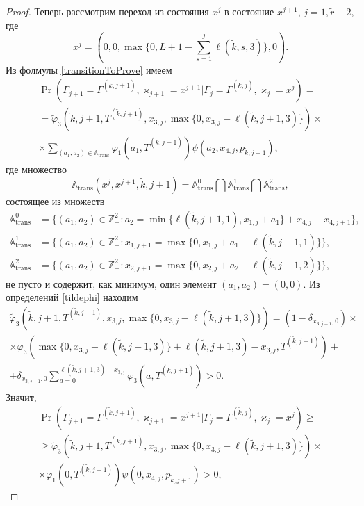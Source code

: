 \documentclass[a4paper,12pt,russian]{extarticle}
\begin{document}
\begin{proof}
Теперь рассмотрим переход из состояния $x^j$ в состояние $x^{j+1}$, $j=\overline{1,\tilde{r}-2}$, где
\begin{equation*}
x^j = (0,0,\max{\{0,L+1-\sum_{s=1}^{j} \ell(\tilde{k},s,3)\}},0).
\end{equation*}
Из фолмулы \eqref{transitionToProve} имеем
\begin{multline*}
\Pr(\Gamma_{j+1}=\Gamma^{(\tilde{k},j+1)}, \varkappa_{j+1}=x^{j+1}|
\Gamma_{j}=\Gamma^{(\tilde{k},j)}, \varkappa_{j}=x^j)=\\
=\widetilde{\varphi}_3(\tilde{k},j+1,T^{(\tilde{k},j+1)},x_{3,j},\max{\{0,x_{3,j} - \ell(\tilde{k},j+1,3)\}})\times \\
\times
\sum_{(a_1,a_2)\in {\mathbb A}_{\mathrm{trans}}}\varphi_1(a_1,T^{(\tilde{k},j+1)})  \psi(a_2,x_{4,j}, p_{\tilde{k},j+1}),
\end{multline*}
где множество 
\begin{equation*}
{\mathbb A}_{\mathrm{trans}}(x^j,x^{j+1},\tilde{k},j+1) = {\mathbb A}_{\mathrm{trans}}^0 \bigcap {\mathbb A}_{\mathrm{trans}}^1\bigcap {\mathbb A}_{\mathrm{trans}}^2,
\end{equation*}
состоящее из множеств 
\begin{align*}
{\mathbb A}_{\mathrm{trans}}^0 &= \{(a_1,a_2) \in \mathbb{Z}_+^2 \colon a_2 = \min{\{\ell(\tilde{k},j+1,1), x_{1,j}+a_1}\} +x_{4,j}- x_{4,j+1}\},\\
{\mathbb A}_{\mathrm{trans}}^1 &= \{(a_1,a_2) \in \mathbb{Z}_+^2 \colon x_{1,j+1}=\max{\{0,x_{1,j}+a_1-\ell(\tilde{k},j+1,1)\}}\},\\
 {\mathbb A}_{\mathrm{trans}}^2 &= \{(a_1,a_2) \in \mathbb{Z}_+^2 \colon  x_{2,j+1} =\max{\{0,x_{2,j}+a_2-\ell(\tilde{k},j+1,2)\}}\},
\end{align*}
не пусто и содержит, как минимум, один элемент $(a_1,a_2)=(0,0)$. Из определений \eqref{tildephi} находим
\begin{multline*}
\widetilde{\varphi}_3(\tilde{k},j+1,T^{(\tilde{k},j+1)},x_{3,j},\max{\{0,x_{3,j} - \ell(\tilde{k},j+1,3)\}})= (1-\delta_{x_{3,j+1},0}) \times \\\times\varphi_3(\max{\{0,x_{3,j} - \ell(\tilde{k},j+1,3)\}} + \ell (\tilde{k},j+1,3) - x_{3,j},T^{(\tilde{k},j+1)} ) 
+\\+\delta_{x_{3,j+1},0} \sum_{a=0}^{\ell(\tilde{k},j+1,3)-x_{3,j}}\varphi_3 (a,T^{(\tilde{k},j+1)})>0.
\end{multline*}
Значит,
\begin{multline*}
\Pr(\Gamma_{j+1}=\Gamma^{(\tilde{k},j+1)}, \varkappa_{j+1}=x^{j+1}|
\Gamma_{j}=\Gamma^{(\tilde{k},j)}, \varkappa_{j}=x^j)\geqslant \\
\geqslant \widetilde{\varphi}_3(\tilde{k},j+1,T^{(\tilde{k},j+1)},x_{3,j},\max{\{0,x_{3,j} - \ell(\tilde{k},j+1,3)\}})
\times \\ \times
\varphi_1(0,T^{(\tilde{k},j+1)})  \psi(0,x_{4,j}, p_{\tilde{k},j+1}) > 0,
\end{multline*}


\end{proof}
\end{document}
